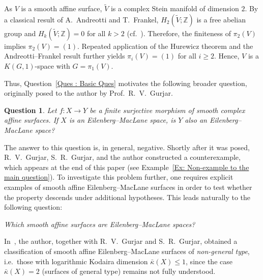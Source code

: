 \documentclass[12pt,reqno,twoside]{amsart}
\newtheorem{question}[theorem]{Question}
\theoremstyle{definition}
\numberwithin{equation}{section}
\newcommand{\Z}{\mathbb{Z}}
\newcommand{\Kbar}{\bar{\kappa}}
\begin{document}
As $V$ is a smooth affine surface, $\widetilde{V}$ is a complex Stein manifold of dimension $2$. By a classical result of A.~Andreotti and T.~Frankel, $H_2(\widetilde{V};\Z)$ is a free abelian group and $H_k(\widetilde{V};\Z)=0$ for all $k>2$ (cf.~\cite{AF1959}). Therefore, the finiteness of $\pi_2(V)$ implies $\pi_2(V)=(1)$. Repeated application of the Hurewicz theorem and the Andreotti--Frankel result further yields $\pi_i(V)=(1)$ for all $i \ge 2$. Hence, $V$ is a $K(G,1)$-space with $G=\pi_1(V)$.

\medskip

Thus, Question~\ref{Ques : Basic Ques} motivates the following broader question, originally posed to the author by Prof.~R.~V.~Gurjar.

\begin{question}\label{Main Ques: Descent of EM}
Let $f \colon X \to Y$ be a finite surjective morphism of smooth complex affine surfaces. If $X$ is an Eilenberg--MacLane space, is $Y$ also an Eilenberg--MacLane space?
\end{question}

The answer to this question is, in general, negative. Shortly after it was posed, R.~V.~Gurjar, S.~R.~Gurjar, and the author constructed a counterexample, which appears at the end of this paper (see Example~\ref{Ex: Non-example to the main question}). To investigate this problem further, one requires explicit examples of smooth affine Eilenberg--MacLane surfaces in order to test whether the property descends under additional hypotheses. This leads naturally to the following question:

\begin{center}
\emph{Which smooth affine surfaces are Eilenberg--MacLane spaces?}
\end{center}

\medskip

In~\cite{GGH2023}, the author, together with R.~V.~Gurjar and S.~R.~Gurjar, obtained a classification of smooth affine Eilenberg--MacLane surfaces of \emph{non-general type}, i.e.~those with logarithmic Kodaira dimension $\Kbar(X) \le 1$, since the case $\Kbar(X)=2$ (surfaces of general type) remains not fully understood.
\end{document}
